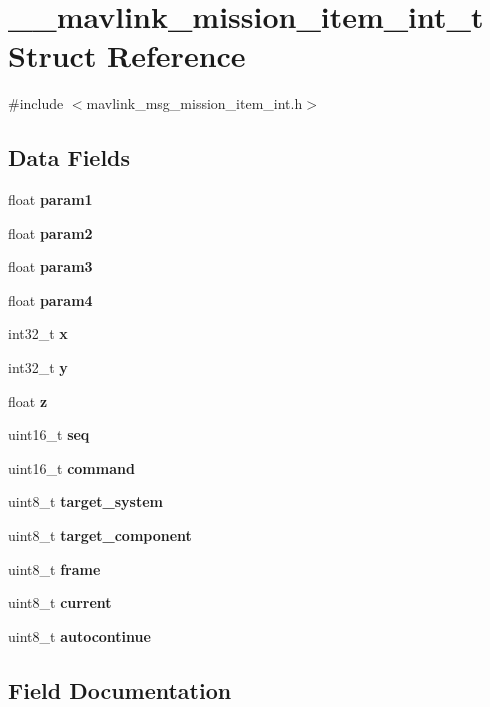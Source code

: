 \section{\+\_\+\+\_\+mavlink\+\_\+mission\+\_\+item\+\_\+int\+\_\+t Struct Reference}
\label{struct____mavlink__mission__item__int__t}


{\ttfamily \#include $<$mavlink\+\_\+msg\+\_\+mission\+\_\+item\+\_\+int.\+h$>$}

\subsection*{Data Fields}
\begin{DoxyCompactItemize}
\item 
float \textbf{ param1}
\item 
float \textbf{ param2}
\item 
float \textbf{ param3}
\item 
float \textbf{ param4}
\item 
int32\+\_\+t \textbf{ x}
\item 
int32\+\_\+t \textbf{ y}
\item 
float \textbf{ z}
\item 
uint16\+\_\+t \textbf{ seq}
\item 
uint16\+\_\+t \textbf{ command}
\item 
uint8\+\_\+t \textbf{ target\+\_\+system}
\item 
uint8\+\_\+t \textbf{ target\+\_\+component}
\item 
uint8\+\_\+t \textbf{ frame}
\item 
uint8\+\_\+t \textbf{ current}
\item 
uint8\+\_\+t \textbf{ autocontinue}
\end{DoxyCompactItemize}


\subsection{Field Documentation}
\mbox{\label{struct____mavlink__mission__item__int__t_a452a7419e65a96e39663cde437451882}} 
